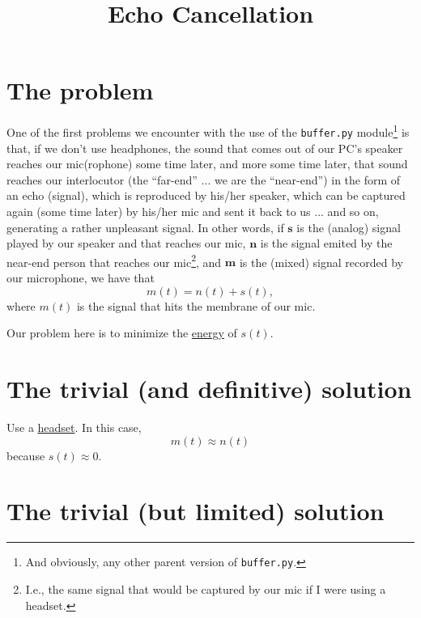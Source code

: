 
\title{Echo Cancellation}

\maketitle

\section{The problem}

One of the first problems we encounter with the use of the
\texttt{buffer.py} module\footnote{And obviously, any other parent
  version of \texttt{buffer.py}.} is that, if we don't use headphones,
the sound that comes out of our PC's speaker reaches our mic(rophone)
some time later, and more some time later, that sound reaches our
interlocutor (the ``far-end'' ... we are the ``near-end'') in the form
of an echo (signal), which is reproduced by his/her speaker, which can
be captured again (some time later) by his/her mic and sent it back
to us ... and so on, generating a rather unpleasant signal. In other
words, if ${\mathbf s}$ is the (analog) signal played by our speaker
and that reaches our mic, ${\mathbf n}$ is the signal emited by the
near-end person that reaches our mic\footnote{I.e., the same signal
  that would be captured by our mic if I were using a headset.}, and
${\mathbf m}$ is the (mixed) signal recorded by our microphone, we
have that
\begin{equation}
  m(t) = n(t) + s(t),
  \label{eq:echo_problem}
\end{equation}
where $m(t)$ is the signal that hits the membrane of our mic.

Our problem here is to minimize the
\href{https://en.wikipedia.org/wiki/Energy_(signal_processing)}{energy}
of $s(t)$.

\section{The trivial (and definitive) solution}

Use a \href{https://en.wikipedia.org/wiki/Audio_headset}{headset}. In
this case,
\begin{equation}
  m(t) \approx n(t)
  \label{eq:headset_solution}
\end{equation}
because $s(t)\approx 0$.

\section{The trivial (but limited) solution}

